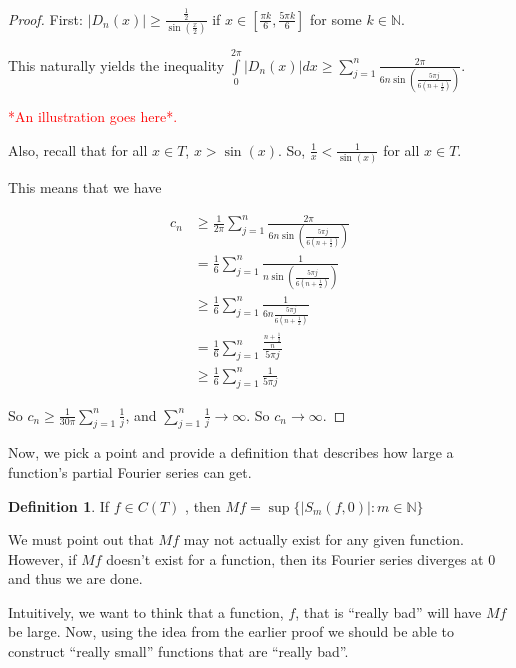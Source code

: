 \documentclass{amsart}
\newcommand{\N}{\mathbb{N}}
\newcommand{\colorcomment}[2]{\textcolor{#1}{#2}} %
\newcommand{\absval}[1]{\lvert #1 \rvert}
\theoremstyle{definition}
\newtheorem{definition}[thm]{Definition}
\begin{document}
\begin{proof}

First: $\absval{D_n(x)} \geq \frac{\frac{1}{2}}{\sin(\frac{x}{2})}$ if $x \in [\frac{\pi k}{6},\frac{5 \pi k}{6}]$ for some $k \in \N$.

This naturally yields the inequality $\int\limits_0^{2\pi} \absval{D_n(x)} dx \geq \sum\limits_{j=1}^n \frac{2 \pi}{6n \sin(\frac{5\pi j}{6(n+\frac{1}{2})})}$. 

\colorcomment{red}{*An illustration goes here*.}

Also, recall that for all $x \in T$, $x > \sin(x)$. 
So, $\frac{1}{x} < \frac{1}{\sin(x)}$ for all $x \in T$.

This means that we have

\begin{align*}
c_n &\geq \frac{1}{2 \pi} \sum\limits_{j=1}^n \frac{2 \pi}{6n \sin(\frac{5\pi j}{6(n+\frac{1}{2})})}\\
&= \frac{1}{6} \sum\limits_{j=1}^n \frac{1}{n \sin(\frac{5\pi j}{6(n+\frac{1}{2})})}\\
&\geq \frac{1}{6} \sum\limits_{j=1}^n \frac{1}{6n \frac{5\pi j}{6(n+\frac{1}{2})}}\\
&= \frac{1}{6} \sum\limits_{j=1}^n \frac{\frac{n+\frac{1}{2}}{n}}{5\pi j}\\
&\geq \frac{1}{6} \sum\limits_{j=1}^n \frac{1}{5\pi j}
\end{align*}

So $c_n \geq \frac{1}{30 \pi} \sum\limits_{j=1}^n \frac{1}{ j}$, and $\sum\limits_{j=1}^n \frac{1}{j} \to \infty$. So $c_n \to \infty$.

\end{proof}

Now, we pick a point and provide a definition that describes how large a function's partial Fourier series can get.

\begin{definition}
If $f \in C(T)$ , then $Mf = \sup\{\absval{S_m(f,0)} : m \in \N\}$ 
\end{definition}

We must point out that $Mf$ may not actually exist for any given function. However, if $Mf$ doesn't exist for a function, then its Fourier series diverges at $0$ and thus we are done.

Intuitively, we want to think that a function, $f$, that is ``really bad'' will have $Mf$ be large. 
Now, using the idea from the earlier proof we should be able to construct ``really small'' functions that are ``really bad''. 
\end{document}
